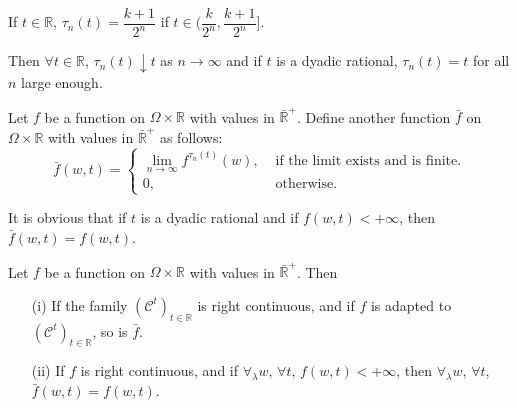 If $t \in\mathbb{R}$, $\tau_n (t) = \dfrac{k+1}{2^n}$ if $t \in
(\dfrac{k}{2^n}, \dfrac{k+1}{2^n}]$. 


Then $\forall t \in \mathbb{R}$, $\tau_n (t) \downarrow t$ as $n \to
\infty$ and if $t$ is a dyadic rational, $\tau_n(t) =t$ for all $n$
large enough. 

Let $f$ be a function on $\Omega \times \mathbb{R}$ with values in
$\bar{\mathbb{R}}^+$. Define another function $\bar{f}$ on $\Omega
\times \mathbb{R}$ with values in $\bar{\mathbb{R}}^+$ as follows:
$$
\bar{f} (w,t) = 
\begin{cases}
\lim\limits_{n\to \infty} f^{\tau_n(t)} (w), & \text{ if the limit
  exists and is finite}.\\
0, & \text{ otherwise.}
\end{cases}
$$

It is obvious that if $t$ is a dyadic rational and if $f(w,t) < +
\infty$, then $\bar{f}(w,t) = f(w,t)$. 

\begin{proposition}\label{part2:chap4:prop66}
Let $f$ be a function on $\Omega \times \mathbb{R}$ with values in
$\bar{\mathbb{R}}^+$. Then 
\begin{itemize}
\item[{\rm (i)}] If the family $(\mathscr{C}^t)_{t\in \mathbb{R}}$ is
  right continuous, and if $f$ is adapted to $(\mathscr{C}^t)_{t\in
    \mathbb{R}}$, so is $\bar{f}$.

\item[{\rm (ii)}] If $f$ is right continuous, and if $\forall_\lambda
  w$, $\forall t$, $f(w,t) < + \infty$, then $\forall_\lambda w$,
  $\forall t$, $\bar{f} (w,t) = f(w,t)$.
\end{itemize}
\end{proposition}

